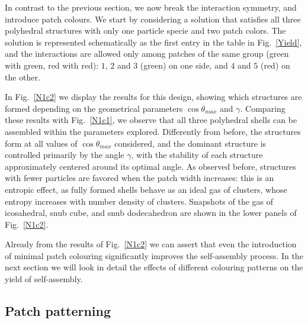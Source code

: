 \documentclass[a4paper, amsfonts, amssymb, amsmath, reprint, showkeys, nofootinbib, oneside]{revtex4-1}
\begin{document}
In contrast to the previous section, we now break the interaction symmetry, and introduce patch colours.
We start by considering a solution that satisfies all three polyhedral structures with only one particle specie and two patch colors.
The solution is represented schematically as the first entry in the table in Fig.~\ref{Yield}, and the interactions are allowed only among patches of the same group (green with green, red with red): $1$, $2$ and $3$ (green) on one side, and $4$ and $5$ (red) on the other.

In Fig.~\ref{N1c2} we display the results for this design, showing which structures are formed depending on the geometrical parameters $\cos\theta_{max}$ and $\gamma$. Comparing these results with Fig.~\ref{N1c1}, we observe that all three polyhedral shells can be assembled within the parameters explored. Differently from before, the structures form at all values of $\cos\theta_{max}$ considered, and the dominant structure is controlled primarily by the angle $\gamma$, with the stability of each structure approximately centered around its optimal angle. As observed before, structures with fewer particles are favored when the patch width increases: this is an entropic effect, as fully formed shells behave as an ideal gas of clusters, whose entropy increases with number density of clusters. Snapshots of the gas of icosahedral, snub cube, and snub dodecahedron are shown in the lower panels of Fig.~\ref{N1c2}.

Already from the results of Fig.~\ref{N1c2} we can assert that even the introduction of minimal patch colouring significantly improves the self-assembly process. In the next section we will look in detail the effects of different colouring patterns on the yield of self-assembly.


\subsection{Patch patterning}
\end{document}
